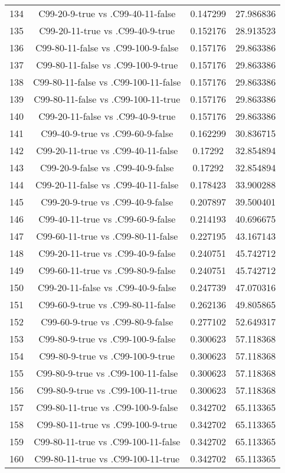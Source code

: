 \documentclass[a4paper,10pt]{article}
\begin{document}
\begin{landscape}
\begin{table}[!htp]
\begin{tabular}{cccc}
134&C99-20-9-true vs .C99-40-11-false&0.147299&27.986836\\
135&C99-20-11-true vs .C99-40-9-true&0.152176&28.913523\\
136&C99-80-11-false vs .C99-100-9-false&0.157176&29.863386\\
137&C99-80-11-false vs .C99-100-9-true&0.157176&29.863386\\
138&C99-80-11-false vs .C99-100-11-false&0.157176&29.863386\\
139&C99-80-11-false vs .C99-100-11-true&0.157176&29.863386\\
140&C99-20-11-false vs .C99-40-9-true&0.157176&29.863386\\
141&C99-40-9-true vs .C99-60-9-false&0.162299&30.836715\\
142&C99-20-11-true vs .C99-40-11-false&0.17292&32.854894\\
143&C99-20-9-false vs .C99-40-9-false&0.17292&32.854894\\
144&C99-20-11-false vs .C99-40-11-false&0.178423&33.900288\\
145&C99-20-9-true vs .C99-40-9-false&0.207897&39.500401\\
146&C99-40-11-true vs .C99-60-9-false&0.214193&40.696675\\
147&C99-60-11-true vs .C99-80-11-false&0.227195&43.167143\\
148&C99-20-11-true vs .C99-40-9-false&0.240751&45.742712\\
149&C99-60-11-true vs .C99-80-9-false&0.240751&45.742712\\
150&C99-20-11-false vs .C99-40-9-false&0.247739&47.070316\\
151&C99-60-9-true vs .C99-80-11-false&0.262136&49.805865\\
152&C99-60-9-true vs .C99-80-9-false&0.277102&52.649317\\
153&C99-80-9-true vs .C99-100-9-false&0.300623&57.118368\\
154&C99-80-9-true vs .C99-100-9-true&0.300623&57.118368\\
155&C99-80-9-true vs .C99-100-11-false&0.300623&57.118368\\
156&C99-80-9-true vs .C99-100-11-true&0.300623&57.118368\\
157&C99-80-11-true vs .C99-100-9-false&0.342702&65.113365\\
158&C99-80-11-true vs .C99-100-9-true&0.342702&65.113365\\
159&C99-80-11-true vs .C99-100-11-false&0.342702&65.113365\\
160&C99-80-11-true vs .C99-100-11-true&0.342702&65.113365\\

\end{tabular}
\end{table}
\end{landscape}
\end{document}
